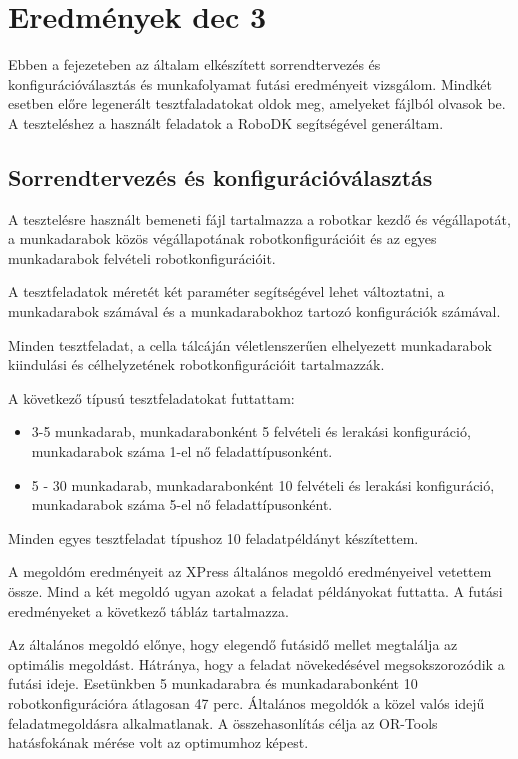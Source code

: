 \chapter{Eredmények dec 3}

Ebben a fejezeteben az általam elkészített sorrendtervezés és konfigurációválasztás és munkafolyamat futási eredményeit vizsgálom. Mindkét esetben előre legenerált tesztfaladatokat oldok meg, amelyeket fájlból olvasok be. A teszteléshez a használt feladatok a RoboDK segítségével generáltam.

\section{Sorrendtervezés és konfigurációválasztás}

A tesztelésre használt bemeneti fájl tartalmazza a robotkar kezdő és végállapotát, a munkadarabok közös végállapotának robotkonfigurációit és az egyes munkadarabok felvételi robotkonfigurációit.  

A tesztfeladatok méretét két paraméter segítségével lehet változtatni, a munkadarabok számával és a munkadarabokhoz tartozó konfigurációk számával. 

Minden tesztfeladat, a cella tálcáján véletlenszerűen elhelyezett munkadarabok kiindulási és célhelyzetének robotkonfigurációit tartalmazzák. 


A következő típusú tesztfeladatokat futtattam:

\begin{itemize}
\item 3-5 munkadarab, munkadarabonként 5 felvételi és lerakási konfiguráció, munkadarabok száma 1-el nő feladattípusonként.

\item 5 - 30 munkadarab, munkadarabonként 10 felvételi és lerakási konfiguráció, munkadarabok száma 5-el nő feladattípusonként.
\end{itemize} 


Minden egyes tesztfeladat típushoz 10 feladatpéldányt készítettem.

A megoldóm eredményeit az XPress általános megoldó eredményeivel vetettem össze. Mind a két megoldó ugyan azokat a feladat példányokat futtatta. A futási eredményeket a következő tábláz tartalmazza.

Az általános megoldó előnye, hogy elegendő futásidő mellet megtalálja az optimális megoldást. Hátránya, hogy a feladat növekedésével megsokszorozódik a futási ideje. Esetünkben 5 munkadarabra és munkadarabonként 10 robotkonfigurációra átlagosan 47 perc. Általános megoldók a közel valós idejű feladatmegoldásra alkalmatlanak. A összehasonlítás célja az OR-Tools hatásfokának mérése volt az optimumhoz képest.

